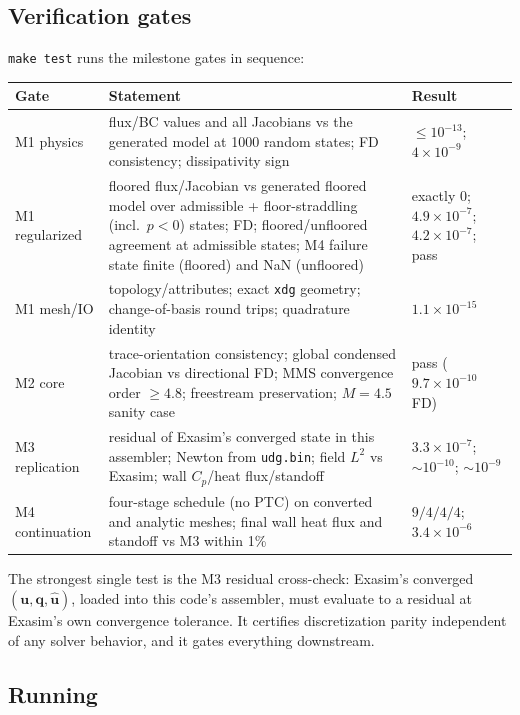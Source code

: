 \documentclass[11pt]{article}
\newcommand{\bu}{\mathbf{u}}
\newcommand{\bq}{\mathbf{q}}
\newcommand{\buh}{\widehat{\mathbf{u}}}
\newcommand{\code}[1]{\texttt{#1}}
\begin{document}
\subsection{Verification gates}
\label{sec:verification}

\code{make test} runs the milestone gates in sequence:
\begin{center}
\small
\begin{tabular}{lp{}l}
\toprule
Gate & Statement & Result\\
\midrule
M1 physics & flux/BC values and all Jacobians vs the generated model at
1000 random states; FD consistency; dissipativity sign & $\le 10^{-13}$;
$4\times10^{-9}$\\
M1 regularized & floored flux/Jacobian vs generated floored model over
admissible + floor-straddling (incl.\ $p<0$) states; FD; floored/unfloored
agreement at admissible states; M4 failure state finite (floored) and NaN
(unfloored) & exactly 0; $4.9\times10^{-7}$; $4.2\times10^{-7}$; pass\\
M1 mesh/IO & topology/attributes; exact \code{xdg} geometry; change-of-basis
round trips; quadrature identity & $1.1\times10^{-15}$\\
M2 core & trace-orientation consistency; global condensed Jacobian vs
directional FD; MMS convergence order $\ge 4.8$; freestream preservation;
$M{=}4.5$ sanity case & pass ($9.7\times10^{-10}$ FD)\\
M3 replication & residual of Exasim's converged state in this assembler;
Newton from \code{udg.bin}; field $L^2$ vs Exasim; wall $C_p$/heat
flux/standoff & $3.3\times10^{-7}$; $\sim10^{-10}$;
$\sim10^{-9}$\\
M4 continuation & four-stage schedule (no PTC) on converted and analytic
meshes; final wall heat flux and standoff vs M3 within 1\% & $9/4/4/4$;
$3.4\times10^{-6}$\\
\bottomrule
\end{tabular}
\end{center}
The strongest single test is the M3 residual cross-check: Exasim's converged
$(\bu, \bq, \buh)$, loaded into this code's assembler, must evaluate to a
residual at Exasim's own convergence tolerance. It certifies discretization
parity independent of any solver behavior, and it gates everything
downstream.

\subsection{Running}
\end{document}
